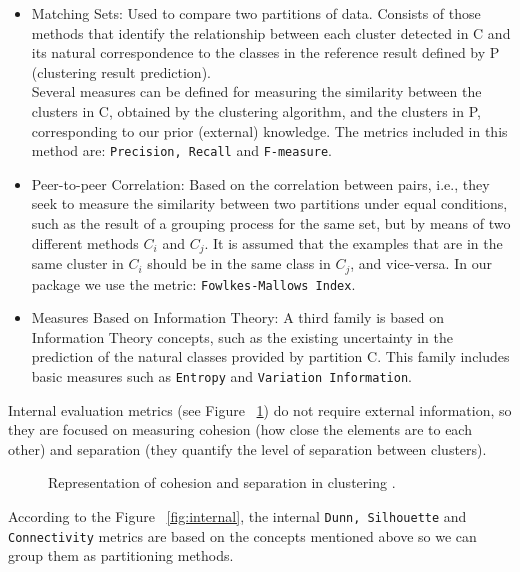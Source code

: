 \begin{itemize}
  \item Matching Sets: Used to compare two partitions of data. Consists of those methods that identify the relationship between each cluster detected in C and its natural correspondence to the classes in the reference result defined by P (clustering result prediction).\\
Several measures can be defined for measuring the similarity between the clusters in C, obtained by the clustering algorithm, and the clusters in P, corresponding to our prior (external) knowledge. The metrics included in this method are: \texttt{Precision, Recall} and \texttt{F-measure}.
  \item Peer-to-peer Correlation: Based on the correlation between pairs, i.e., they seek to measure the similarity between two partitions under equal conditions, such as the result of a grouping process for the same set, but by means of two different methods $ C_{i} $ and $ C_{j} $. It is assumed that the examples that are in the same cluster in $ C_{i} $ should be in the same class in $ C_{j} $, and vice-versa. In our package we use the metric: \texttt{Fowlkes-Mallows Index}.
  \item Measures Based on Information Theory: A third family is based on Information Theory concepts, such as the existing uncertainty in the prediction of the natural classes provided by partition C. This family includes basic measures such as \texttt{Entropy} and \texttt{Variation Information}.
\end{itemize}
Internal evaluation metrics (see Figure ~\ref{fig:cohesion}) do not require external information, so they are focused on measuring cohesion (how close the elements are to each other) and separation (they quantify the level of separation between clusters).
\begin{figure}[htbp]
  \centering
    \caption{Representation of cohesion and separation in clustering \citep{R:palacio-galiano:2019}.}%
    \label{fig:cohesion}%
\end{figure}

According to the Figure ~\ref{fig:internal}, the internal \texttt{Dunn, Silhouette} and \texttt{Connectivity} metrics are based on the concepts mentioned above so we can group them as partitioning methods.

